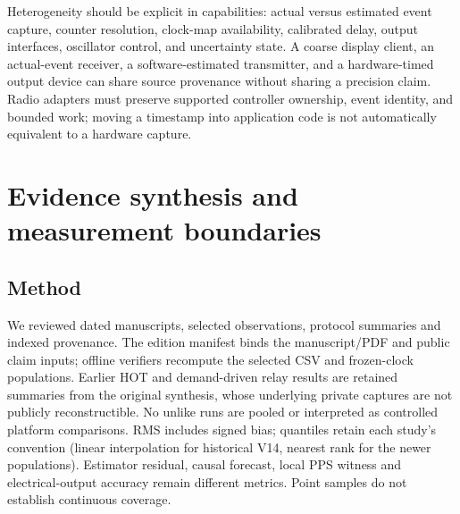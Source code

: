 \documentclass[11pt,letterpaper]{article}
\begin{document}
Heterogeneity should be explicit in capabilities: actual versus estimated event capture, counter resolution, clock-map availability, calibrated delay, output interfaces, oscillator control, and uncertainty state. A coarse display client, an actual-event receiver, a software-estimated transmitter, and a hardware-timed output device can share source provenance without sharing a precision claim. Radio adapters must preserve supported controller ownership, event identity, and bounded work; moving a timestamp into application code is not automatically equivalent to a hardware capture.

\section{Evidence synthesis and measurement boundaries}\label{sec:evidence}
\subsection{Method}
We reviewed dated manuscripts, selected observations, protocol summaries and indexed provenance. The edition manifest binds the manuscript/PDF and public claim inputs; offline verifiers recompute the selected CSV and frozen-clock populations. Earlier HOT and demand-driven relay results are retained summaries from the original synthesis, whose underlying private captures are not publicly reconstructible. No unlike runs are pooled or interpreted as controlled platform comparisons. RMS includes signed bias; quantiles retain each study's convention (linear interpolation for historical V14, nearest rank for the newer populations). Estimator residual, causal forecast, local PPS witness and electrical-output accuracy remain different metrics. Point samples do not establish continuous coverage.
\end{document}
